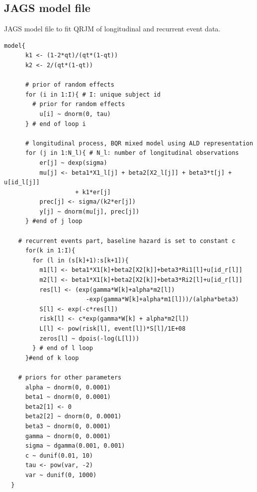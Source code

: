 \subsection{\textsf{JAGS} model file}
\textsf{JAGS} model file to fit QRJM of longitudinal and recurrent event data.
{\small
\begin{verbatim}
model{
      k1 <- (1-2*qt)/(qt*(1-qt))
      k2 <- 2/(qt*(1-qt))

      # prior of random effects
      for (i in 1:I){ # I: unique subject id
        # prior for random effects
          u[i] ~ dnorm(0, tau)
      } # end of loop i

      # longitudinal process, BQR mixed model using ALD representation
      for (j in 1:N_l){ # N_l: number of longitudinal observations
          er[j] ~ dexp(sigma)
          mu[j] <- beta1*X1_l[j] + beta2[X2_l[j]] + beta3*t[j] + u[id_l[j]]
          			+ k1*er[j]
          prec[j] <- sigma/(k2*er[j])
          y[j] ~ dnorm(mu[j], prec[j])
      } #end of j loop

    # recurrent events part, baseline hazard is set to constant c
      for(k in 1:I){
        for (l in (s[k]+1):s[k+1]){
          m1[l] <- beta1*X1[k]+beta2[X2[k]]+beta3*Ri1[l]+u[id_r[l]]
          m2[l] <- beta1*X1[k]+beta2[X2[k]]+beta3*Ri2[l]+u[id_r[l]]
          res[l] <- (exp(gamma*W[k]+alpha*m2[l])
                       -exp(gamma*W[k]+alpha*m1[l]))/(alpha*beta3)
          S[l] <- exp(-c*res[l])
          risk[l] <- c*exp(gamma*W[k] + alpha*m2[l])
          L[l] <- pow(risk[l], event[l])*S[l]/1E+08
          zeros[l] ~ dpois(-log(L[l]))
        } # end of l loop
      }#end of k loop

    # priors for other parameters
      alpha ~ dnorm(0, 0.0001)
      beta1 ~ dnorm(0, 0.0001)
      beta2[1] <- 0
      beta2[2] ~ dnorm(0, 0.0001)
      beta3 ~ dnorm(0, 0.0001)
      gamma ~ dnorm(0, 0.0001)
      sigma ~ dgamma(0.001, 0.001)
      c ~ dunif(0.01, 10)
      tau <- pow(var, -2)
      var ~ dunif(0, 1000)
  }
\end{verbatim}
}





